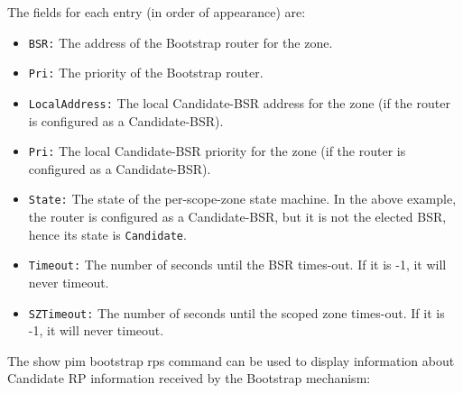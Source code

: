 The fields for each entry (in order of appearance) are:
\begin{itemize}

  \item {\tt BSR:} The address of the Bootstrap router for the zone.

  \item {\tt Pri:} The priority of the Bootstrap router.

  \item {\tt LocalAddress:} The local Candidate-BSR address for the zone
  (if the router is configured as a Candidate-BSR).

  \item {\tt Pri:} The local Candidate-BSR priority for the zone
  (if the router is configured as a Candidate-BSR).

  \item {\tt State:} The state of the per-scope-zone state machine.
  In the above example, the router is configured as a Candidate-BSR, 
  but it is not the elected BSR, hence its state is {\tt Candidate}.

  \item {\tt Timeout:} The number of seconds until the BSR times-out.
  If it is -1, it will never timeout.

  \item {\tt SZTimeout:} The number of seconds until the scoped zone
  times-out. If it is -1, it will never timeout.

\end{itemize}

The {\stt show pim bootstrap rps} command can be used to display
information about Candidate RP information received by the Bootstrap
mechanism:

